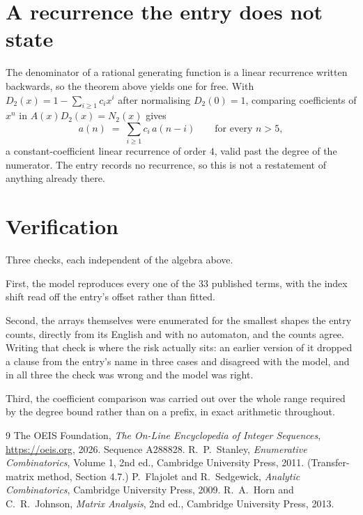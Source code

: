 \documentclass[11pt,a4paper]{article}
\theoremstyle{plain}
\theoremstyle{definition}
\begin{document}
\section{A recurrence the entry does not state}

The denominator of a rational generating function is a linear recurrence written backwards, so
the theorem above yields one for free. With $D_2(x)=1-\sum_{i\ge1}c_ix^i$ after normalising
$D_2(0)=1$, comparing coefficients of $x^n$ in $A(x)D_2(x)=N_2(x)$ gives
\[
a(n)\;=\;\sum_{i\ge1}c_i\,a(n-i)\qquad\text{for every }n>5,
\]
a constant-coefficient linear recurrence of order $4$, valid past the degree of the
numerator. The entry records no recurrence, so this is not a restatement of anything
already there.

\section{Verification}

Three checks, each independent of the algebra above.

First, the model reproduces every one of the $33$ published terms, with the index shift
read off the entry's offset rather than fitted.

Second, the arrays themselves were enumerated for the smallest shapes the entry counts,
directly from its English and with no automaton, and the counts agree. Writing that check is
where the risk actually sits: an earlier version of it dropped a clause from the entry's name
in three cases and disagreed with the model, and in all three the check was wrong and the model
was right.

Third, the coefficient comparison was carried out over the whole range required by the degree
bound rather than on a prefix, in exact arithmetic throughout.

\begin{thebibliography}{9}
 The OEIS Foundation, \emph{The On-Line Encyclopedia of Integer
Sequences}, \url{https://oeis.org}, 2026. Sequence A288828.
 R.~P.~Stanley, \emph{Enumerative Combinatorics}, Volume 1, 2nd ed.,
Cambridge University Press, 2011. (Transfer-matrix method, Section 4.7.)
 P.~Flajolet and R.~Sedgewick, \emph{Analytic Combinatorics}, Cambridge
University Press, 2009.
 R.~A.~Horn and C.~R.~Johnson, \emph{Matrix Analysis}, 2nd ed., Cambridge
University Press, 2013.
\end{thebibliography}
\end{document}
